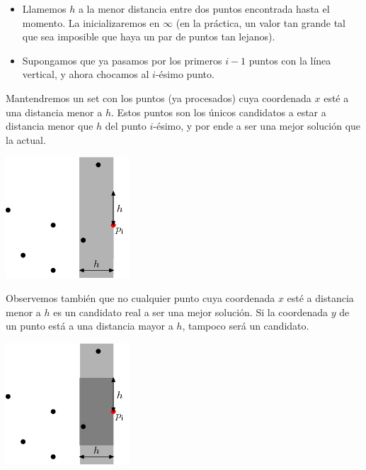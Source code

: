 \documentclass[compress]{beamer}
\begin{document}
\begin{frame}
\begin{itemize}
\item Llamemos $h$ a la menor distancia entre dos puntos encontrada hasta el momento. 
La inicializaremos en $\infty$ (en la pr\'actica, un valor tan grande tal que sea imposible que haya un par de puntos tan lejanos).

\bigskip

\item Supongamos que ya pasamos por los primeros $i-1$ puntos con la l\'inea vertical, y ahora chocamos al $i$-\'esimo punto.
\end{itemize}
\end{frame}

\begin{frame}

Mantendremos un set con los puntos (ya procesados) cuya coordenada $x$ est\'e a una distancia menor a $h$. 
Estos puntos son los \'unicos candidatos a estar a distancia menor que $h$ del punto $i$-\'esimo, y por ende a ser una mejor soluci\'on que la actual. \bigskip

\begin{center}
\includegraphics[scale=0.6]{images/closest2.png}
\end{center}

\end{frame}

\begin{frame}
Observemos también que no cualquier punto cuya coordenada $x$ est\'e a distancia menor a $h$ es un candidato real 
a ser una mejor soluci\'on. Si la coordenada $y$ de un punto est\'a a una distancia mayor a $h$, tampoco ser\'a un candidato. 

\begin{center}
\includegraphics[scale=0.6]{images/closest.png}
\end{center}

\end{frame}
\end{document}
